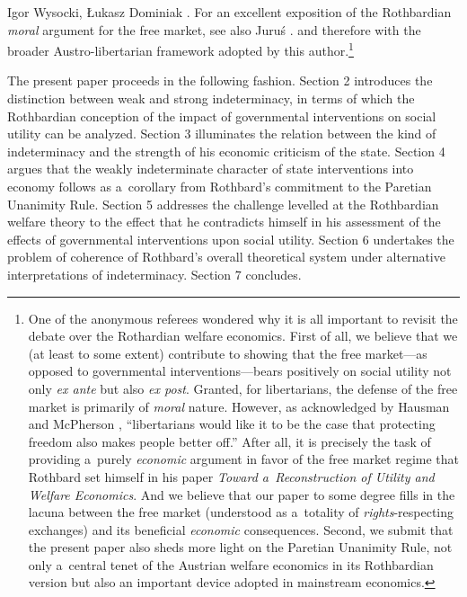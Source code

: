 \begin{artengenv}{Igor Wysocki, Łukasz Dominiak}
{%
\parencites*[][]{rothbard_for_2006}[][]{rothbard_man_2009}[][]{rothbard_ethics_2002}. %
 For an excellent exposition of the Rothbardian \textit{moral} argument for the free market, see also Juruś 
\parencite*[][]{jurus_w_2012}. %
 } and therefore with the broader Austro-libertarian framework adopted by this author.\footnote{One of the anonymous referees wondered why it is all important to revisit the debate over the Rothardian welfare economics. First of all, we believe that we (at least to some extent) contribute to showing that the free market---as opposed to governmental interventions---bears positively on social utility not only \textit{ex ante} but also \textit{ex post}. Granted, for libertarians, the defense of the free market is primarily of \textit{moral} nature. However, as acknowledged by Hausman and McPherson 
\parencite*[][p.172]{hausman_economic_2006}, %
 ``libertarians would like it to be the case that protecting freedom also makes people better off.'' After all, it is precisely the task of providing a~purely \textit{economic} argument in favor of the free market regime that Rothbard set himself in his paper \textit{Toward a~Reconstruction of Utility and Welfare Economics}. And we believe that our paper to some degree fills in the lacuna between the free market (understood as a~totality of \textit{rights}{-respecting exchanges) and its beneficial }\textit{economic} consequences. Second, we submit that the present paper also sheds more light on the Paretian Unanimity Rule, not only a~central tenet of the Austrian welfare economics in its Rothbardian version but also an important device adopted in mainstream economics. }



The present paper proceeds in the following fashion. Section 2 introduces the distinction between weak and strong indeterminacy, in terms of which the Rothbardian conception of the impact of governmental interventions on social utility can be analyzed. Section 3 illuminates the relation between the kind of indeterminacy and the strength of his economic criticism of the state. Section 4 argues that the weakly indeterminate character of state interventions into economy follows as a~corollary from Rothbard's commitment to the Paretian Unanimity Rule. Section 5 addresses the challenge levelled at the Rothbardian welfare theory to the effect that he contradicts himself in his assessment of the effects of governmental interventions upon social utility. Section 6 undertakes the problem of coherence of Rothbard's overall theoretical system under alternative interpretations of indeterminacy. Section 7 concludes.




\end{artengenv}
